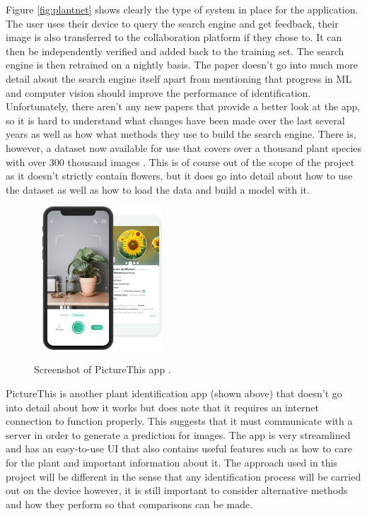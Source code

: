 \documentclass[12pt,a4paper]{report}
\begin{document}
Figure \ref{fig:plantnet} shows clearly the type of system in place for the application. The user uses their device to 
query the search
engine and get feedback, their image is also transferred to the collaboration platform if they chose to. It can then be 
independently verified and added back to the training set. The search engine is then retrained on a nightly basis. The 
paper doesn't go into much more detail about the search engine itself apart from mentioning that progress in ML 
and computer vision should improve the performance of identification. Unfortunately, there aren't any new 
papers that provide a better look at the app, so it is hard to understand what changes have been made over the last 
several years as well as how what methods they use to build the search engine. There is, however, a dataset now 
available for use that covers over a thousand plant species with over 300 thousand images 
\citep{camille_garcin_2021_5645731}. This is of course out of the scope of the project as it doesn't strictly contain 
flowers, but it does go into detail about how to use the dataset as well as how to load the data and build a model with 
it.

\begin{figure}[h]\
    \centering
    \includegraphics[width=0.4\textwidth]{picturethis.png}
    \caption{Screenshot of PictureThis app \citep{picturethis}.}
\end{figure}

\break

PictureThis is another plant identification app (shown above) that doesn't go into detail about how it works but does 
note that it requires an internet connection to function properly. This suggests that it must communicate with a server 
in order to generate a prediction for images. The app is very streamlined and has an easy-to-use UI that also contains 
useful features such as how to care for the plant and important information about it. The approach used in this project
will be different in 
the sense that any identification process will be carried out on the device however, it is still important to consider 
alternative methods and how they perform so that comparisons can be made.
\end{document}
